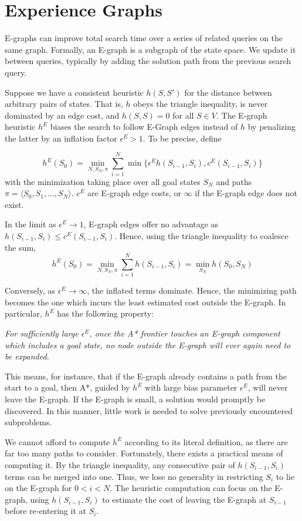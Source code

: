 \documentclass[letterpaper]{article}
\begin{document}
\section{Experience Graphs}

E-graphs can improve total search time over a series of related queries on the same graph.
Formally, an E-graph is a subgraph of the state space.
We update it between queries, typically by adding the solution path from the previous search query.

Suppose we have a consistent heuristic $h(S,S')$ for the distance between arbitrary pairs of states.
That is, $h$ obeys the triangle inequality, is never dominated by an edge cost, and $h(S,S) = 0$ for all $S\in V$.
The E-graph heuristic $h^E$ biases the search to follow E-Graph edges instead of $h$ by penalizing the latter by an inflation factor $\epsilon^E > 1$.
To be precise, define

\[h^E(S_0) = \min_{N,S_N,\pi} \sum_{i=1}^N \min \{\epsilon^E h(S_{i-1},S_i),c^E(S_{i-1},S_i)\}\]
with the minimization taking place over all goal states $S_N$ and paths $\pi = \langle S_0,S_1,...,S_N \rangle$. $c^E$ are E-graph edge costs, or $\infty$ if the E-graph edge does not exist.

In the limit as $\epsilon^E \rightarrow 1$, E-graph edges offer no advantage as $h(S_{i-1},S_i) \le c^E(S_{i-1},S_i)$. Hence, using the triangle inequality to coalesce the sum,
\[h^E(S_0) = \min_{N,S_N,\pi} \sum_{i=1}^N h(S_{i-1},S_i) = \min_{S_N} h(S_0,S_N)\]

Conversely, as $\epsilon^E \rightarrow\infty$, the inflated terms dominate. Hence, the minimizing path becomes the one which incurs the least estimated cost outside the E-graph. In particular, $h^E$ has the following property:

\textit{For sufficiently large $\epsilon^E$, once the A* frontier touches an E-graph component which includes a goal state, no node outside the E-graph will ever again need to be expanded.}

This means, for instance, that if the E-graph already contains a path from the start to a goal, then A*, guided by $h^E$ with large bias parameter $\epsilon^E$, will never leave the E-graph.
If the E-graph is small, a solution would promptly be discovered.
In this manner, little work is needed to solve previously encountered subproblems.

We cannot afford to compute $h^E$ according to its literal definition, as there are far too many paths to consider.
Fortunately, there exists a practical means of computing it. By the triangle inequality, any consecutive pair of $h(S_{i-1},S_i)$ terms can be merged into one.
Thus, we lose no generality in restricting $S_i$ to lie on the E-graph for $0 < i < N$.
The heuristic computation can focus on the E-graph, using $h(S_{i-1},S_i)$ to estimate the cost of leaving the E-graph at $S_{i-1}$ before re-entering it at $S_i$.
\end{document}
